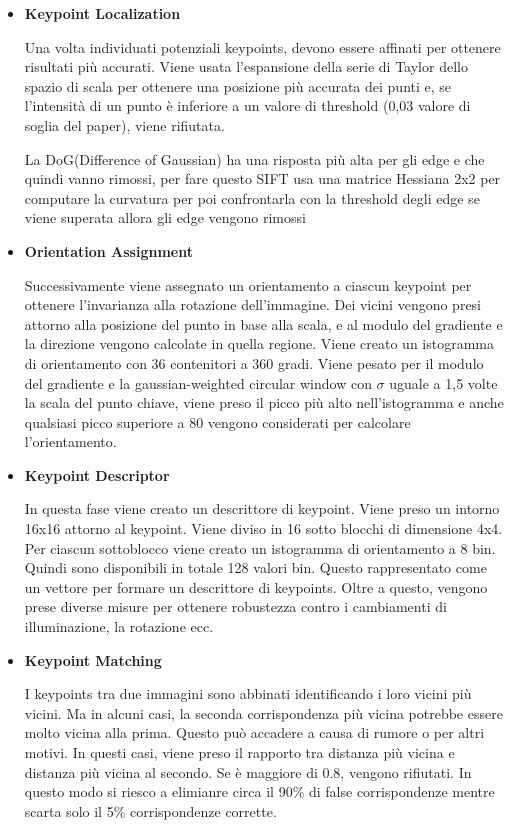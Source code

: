 \begin{itemize}

\item \textbf{Keypoint Localization}

Una volta individuati potenziali keypoints, devono essere affinati per ottenere risultati più accurati. Viene usata l'espansione della serie di Taylor dello spazio di scala per ottenere una posizione più accurata dei punti e, se l'intensità di un punto è inferiore a un valore di threshold (0,03 valore di soglia del paper), viene rifiutata.

La DoG(Difference of Gaussian) ha una risposta più alta per gli edge e che quindi vanno rimossi, per fare questo SIFT usa una matrice Hessiana 2x2 per computare la curvatura per poi confrontarla con la threshold degli edge se viene superata allora gli edge vengono rimossi
\item \textbf{Orientation Assignment}

Successivamente viene assegnato un orientamento a ciascun keypoint per ottenere l'invarianza alla rotazione dell'immagine. Dei vicini vengono presi attorno alla posizione del punto in base alla scala, e al modulo del gradiente e la direzione vengono calcolate in quella regione. Viene creato un istogramma di orientamento con 36 contenitori a 360 gradi. Viene pesato per il modulo del gradiente e la gaussian-weighted circular window con $\sigma$ uguale a 1,5 volte la scala del punto chiave, viene preso il picco più alto nell'istogramma e anche qualsiasi picco superiore a 80 vengono considerati per calcolare l'orientamento.
\item \textbf{Keypoint Descriptor}

In questa fase viene creato un descrittore di keypoint. Viene preso un intorno 16x16 attorno al keypoint. Viene  diviso in 16 sotto blocchi di dimensione 4x4. Per ciascun sottoblocco viene creato un istogramma di orientamento a 8 bin. Quindi sono disponibili in totale 128 valori bin. Questo rappresentato come un vettore per formare un descrittore di keypoints. Oltre a questo, vengono prese diverse misure per ottenere robustezza contro i cambiamenti di illuminazione, la rotazione ecc.


\item \textbf{Keypoint Matching}

I keypoints tra due immagini sono abbinati identificando i loro vicini più vicini. Ma in alcuni casi, la seconda corrispondenza più vicina potrebbe essere molto vicina alla prima. Questo può accadere a causa di rumore o per altri motivi. In questi casi, viene preso il rapporto tra distanza più vicina e distanza più vicina al secondo. Se è maggiore di 0.8, vengono rifiutati. In questo modo si riesco a elimianre circa il 90\% di false corrispondenze mentre scarta solo il 5\% corrispondenze corrette.
	


\end{itemize}

